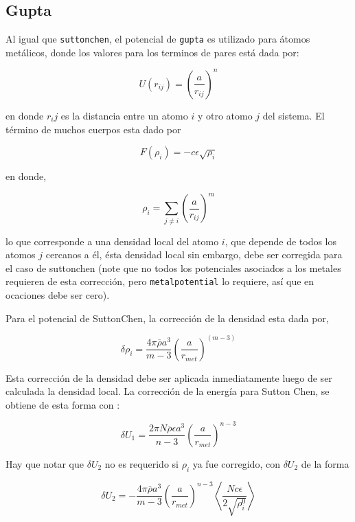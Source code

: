 
\subsection{Gupta}

Al igual que \verb|suttonchen|, el potencial de \verb|gupta| es utilizado para \'atomos met\'alicos, donde los valores para los terminos de pares est\'a dada por:

$$U(r_{ij}) = \left(\frac{a}{r_{ij}}\right)^n$$

en donde $r_ij$ es la distancia entre un atomo $i$ y otro atomo $j$ del sistema. El t\'ermino de muchos cuerpos esta dado por

$$F(\rho_{i}) = -c\epsilon\sqrt{\rho_i}$$

en donde,

$$\rho_i = \sum_{j\neq i} \left(\frac{a}{r_{ij}}\right)^m$$

lo que corresponde a una densidad local del atomo $i$, que depende de todos los atomos $j$ cercanos a \'el, \'esta densidad local sin embargo, debe ser corregida para el caso de suttonchen (note que no todos los potenciales asociados a los metales requieren de esta correcci\'on, pero \verb|metalpotential| lo requiere, as\'i que en ocaciones debe ser cero).

Para el potencial de SuttonChen, la correcci\'on de la densidad esta dada por,

$$\delta\rho_i=\frac{4\pi\overline{\rho}a^3}{m-3}\left(\frac{a}{r_{met}}\right)^{(m-3)}$$

Esta correcci\'on de la densidad debe ser aplicada inmediatamente luego de ser calculada la densidad local. La correcci\'on de la energ\'ia para Sutton Chen, se obtiene de esta forma con :

$$\delta U_1 = \frac{2\pi N\overline{\rho}\epsilon a^3}{n-3}\left(\frac{a}{r_{met}}\right)^{n-3}$$

Hay que notar que $\delta U_2$ no es requerido si $\rho_i$ ya fue corregido, con $\delta U_2$ de la forma

$$\delta U_2 = -\frac{4\pi\overline{\rho}a^3}{m-3}\left(\frac{a}{r_{met}}\right)^{n-3}\left<\frac{Nc\epsilon}{2\sqrt{\rho_i^0}}\right>$$


